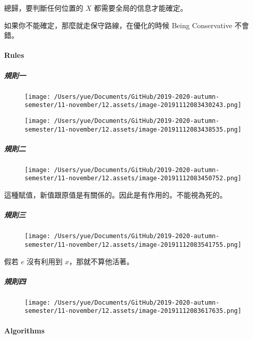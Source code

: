 \documentclass[
]{article}
\begin{document}
總歸，要判斷任何位置的 \(X\) 都需要全局的信息才能確定。

如果你不能確定，那麼就走保守路線，在優化的時候 Being Conservative
不會錯。

\hypertarget{header-n58}{%
\paragraph{Rules}\label{header-n58}}

\hypertarget{header-n59}{%
\subparagraph{規則一}\label{header-n59}}

\begin{figure}
\centering
\texttt{[image: /Users/yue/Documents/GitHub/2019-2020-autumn-semester/11-november/12.assets/image-20191112083430243.png]}
\caption{}
\end{figure}

\begin{figure}
\centering
\texttt{[image: /Users/yue/Documents/GitHub/2019-2020-autumn-semester/11-november/12.assets/image-20191112083438535.png]}
\caption{}
\end{figure}

\hypertarget{header-n62}{%
\subparagraph{規則二}\label{header-n62}}

\begin{figure}
\centering
\texttt{[image: /Users/yue/Documents/GitHub/2019-2020-autumn-semester/11-november/12.assets/image-20191112083450752.png]}
\caption{}
\end{figure}

這種賦值，新值跟原值是有關係的。因此是有作用的。不能視為死的。

\hypertarget{header-n65}{%
\subparagraph{規則三}\label{header-n65}}

\begin{figure}
\centering
\texttt{[image: /Users/yue/Documents/GitHub/2019-2020-autumn-semester/11-november/12.assets/image-20191112083541755.png]}
\caption{}
\end{figure}

假若 \(e\) 沒有利用到 \(x\)，那就不算他活著。

\hypertarget{header-n68}{%
\subparagraph{規則四}\label{header-n68}}

\begin{figure}
\centering
\texttt{[image: /Users/yue/Documents/GitHub/2019-2020-autumn-semester/11-november/12.assets/image-20191112083617635.png]}
\caption{}
\end{figure}

\hypertarget{header-n70}{%
\paragraph{Algorithms}\label{header-n70}}
\end{document}
